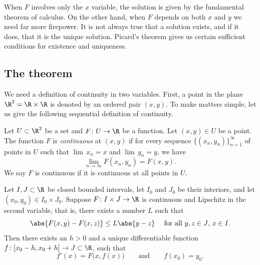 \documentclass[12pt]{book}
\begin{document}
When $F$ involves only the $x$ variable, the solution is given by the
fundamental theorem of calculus.
On the other hand, when $F$ depends
on both $x$ and $y$ we need far more firepower.
It is not always
true that a solution exists, and if it does, that it is the unique solution.
Picard's theorem gives us certain sufficient conditions for existence
and uniqueness.

\subsection*{The theorem}

We need a definition of continuity in two variables.
First, a point in the
plane $\R^2 = \R \times \R$ is denoted by an ordered pair $(x,y)$.
To make matters simple, let
us give the following sequential definition of continuity.

\begin{defn}
Let $U \subset \R^2$ be a set and $F \colon U \to \R$ be a function.
Let $(x,y) \in U$ be a point.
The function $F$ is \emph{continuous}
at $(x,y)$ if 
for every sequence
$\{ (x_n,y_n) \}_{n=1}^\infty$ of points in $U$ such that
$\lim\, x_n = x$ and 
$\lim\, y_n = y$, we have 
\begin{equation*}
\lim_{n \to \infty} F(x_n,y_n) = 
F(x,y) .
\end{equation*}
We say $F$ is continuous if it is continuous at all points in $U$.
\end{defn}

\begin{thm}%
Let $I, J \subset \R$ be closed bounded intervals, 
let $I_0$ and $J_0$ be their interiors, and
let $(x_0,y_0) \in I_0 \times J_0$.
Suppose $F \colon I \times J \to \R$ is continuous
and Lipschitz in the second variable, that is, there exists a number $L$
such that
\begin{equation*}
\abs{F(x,y) - F(x,z)} \leq L \abs{y-z}
\ \ \ \text{ for all $y,z \in J$, $x \in I$} .
\end{equation*}
Then there exists an $h > 0$ and a unique differentiable
function $f \colon [x_0 - h, x_0 + h] \to J \subset \R$, such that
\begin{equation} \label{picard:diffeq}
f'(x) = F\bigl(x,f(x)\bigr) \qquad \text{and} \qquad f(x_0) = y_0.
\end{equation}
\end{thm}
\end{document}
